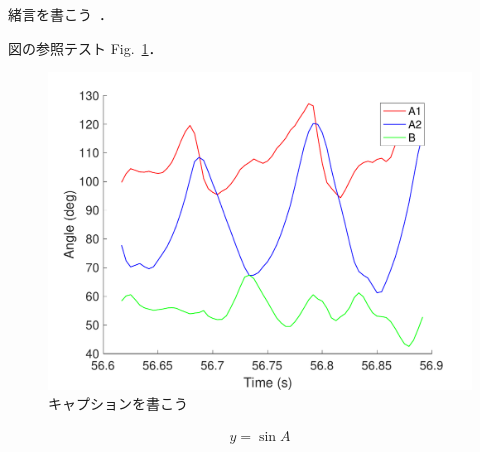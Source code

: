 

緒言を書こう~\cite{bibtest}．

図の参照テスト Fig.~\ref{fig:test}．%


\begin{figure}[tb]
    \centering 
     \includegraphics[width=\columnwidth]{./figure/testfig.pdf}
     \caption{キャプションを書こう}
     \label{fig:test}
\end{figure}

\begin{align}
    y=\sin{A}
    \label{eq:test}
\end{align}




